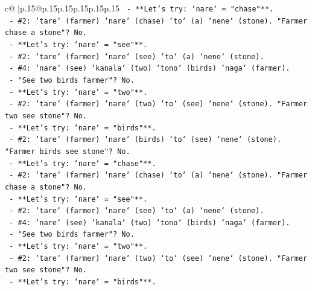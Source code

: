 \documentclass{article}
\begin{document}
{\begin{supertabular}{c@{$\;$}|p{.15\linewidth}@{}p{.15\linewidth}p{.15\linewidth}p{.15\linewidth}p{.15\linewidth}p{.15\linewidth}}
{{{\texttt{                           {-} **Let's try: `nare` = "chase"**.} \\
\texttt{                             {-} \#2: `tare` (farmer) `nare` (chase) `to` (a) `nene` (stone). "Farmer chase a stone"? No.} \\
\texttt{                           {-} **Let's try: `nare` = "see"**.} \\
\texttt{                             {-} \#2: `tare` (farmer) `nare` (see) `to` (a) `nene` (stone).} \\
\texttt{                             {-} \#4: `nare` (see) `kanala` (two) `tono` (birds) `naga` (farmer).} \\
\texttt{                             {-} "See two birds farmer"? No.} \\
\texttt{                           {-} **Let's try: `nare` = "two"**.} \\
\texttt{                             {-} \#2: `tare` (farmer) `nare` (two) `to` (see) `nene` (stone). "Farmer two see stone"? No.} \\
\texttt{                           {-} **Let's try: `nare` = "birds"**.} \\
\texttt{                             {-} \#2: `tare` (farmer) `nare` (birds) `to` (see) `nene` (stone). "Farmer birds see stone"? No.} \\
\texttt{                           {-} **Let's try: `nare` = "chase"**.} \\
\texttt{                             {-} \#2: `tare` (farmer) `nare` (chase) `to` (a) `nene` (stone). "Farmer chase a stone"? No.} \\
\texttt{                           {-} **Let's try: `nare` = "see"**.} \\
\texttt{                             {-} \#2: `tare` (farmer) `nare` (see) `to` (a) `nene` (stone).} \\
\texttt{                             {-} \#4: `nare` (see) `kanala` (two) `tono` (birds) `naga` (farmer).} \\
\texttt{                             {-} "See two birds farmer"? No.} \\
\texttt{                           {-} **Let's try: `nare` = "two"**.} \\
\texttt{                             {-} \#2: `tare` (farmer) `nare` (two) `to` (see) `nene` (stone). "Farmer two see stone"? No.} \\
\texttt{                           {-} **Let's try: `nare` = "birds"**.} \\
}}}
\end{supertabular}}
\end{document}
